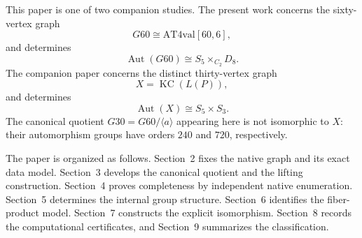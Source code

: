 This paper is one of two companion studies. The present work concerns
the sixty-vertex graph
\[
G60\cong \mathrm{AT4val}[60,6],
\]
and determines
\[
\operatorname{Aut}(G60)\cong S_5\times_{C_2}D_8.
\]
The companion paper concerns the distinct thirty-vertex graph
\[
X=\operatorname{KC}(L(P)),
\]
and determines
\[
\operatorname{Aut}(X)\cong S_5\times S_3.
\]
The canonical quotient $G30=G60/\langle a\rangle$ appearing here is not
isomorphic to $X$: their automorphism groups have orders $240$ and $720$,
respectively.

The paper is organized as follows. Section~2 fixes the native graph and
its exact data model. Section~3 develops the canonical quotient and the
lifting construction. Section~4 proves completeness by independent
native enumeration. Section~5 determines the internal group structure.
Section~6 identifies the fiber-product model. Section~7 constructs the
explicit isomorphism. Section~8 records the computational certificates,
and Section~9 summarizes the classification.
